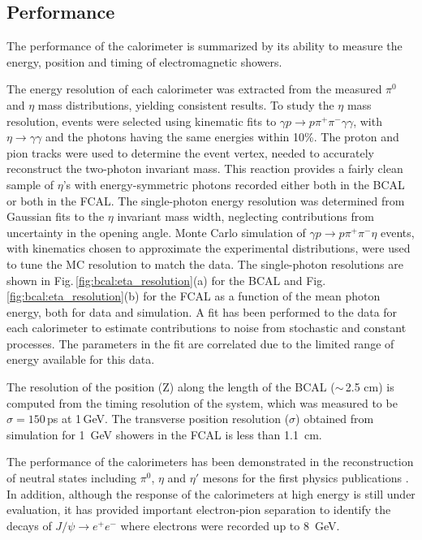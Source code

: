 \subsection{Performance \label{sec:calperformance}}
The performance of the calorimeter is summarized by its ability to measure the energy, position and timing of electromagnetic showers.

The energy resolution of each calorimeter was extracted from the measured $\pi^0$ and $\eta$ mass distributions, yielding consistent results. 
To study the $\eta$ mass resolution, events were selected using kinematic fits to $\gamma p \rightarrow p \pi^+ \pi^- \gamma \gamma$, with $\eta\rightarrow \gamma\gamma$ and the photons having the same energies within 10\%.
The proton and pion tracks were used to determine the event vertex, needed to accurately reconstruct the two-photon invariant mass.
This reaction provides a fairly clean sample of $\eta$'s with energy-symmetric photons recorded either both in the BCAL or both in the FCAL. 
The single-photon energy resolution was determined from Gaussian fits to the $\eta$ invariant mass width, neglecting contributions from uncertainty in the opening angle.
Monte Carlo simulation of $\gamma p \rightarrow p \pi^+ \pi^- \eta$ events, with kinematics chosen to approximate the experimental distributions, were used to tune the MC resolution to match the data. 
The single-photon resolutions are shown in Fig.\,\ref{fig:bcal:eta_resolution}(a) for the BCAL and Fig.\,\ref{fig:bcal:eta_resolution}(b) for the FCAL as a function of the mean photon energy, both for data and simulation.
A fit has been performed to the data for each calorimeter to estimate contributions to noise from stochastic and constant processes.  The parameters in the fit are correlated due to the limited range of energy available for this data.

The resolution of the position (Z) along the length of the BCAL ($\sim$\,2.5 cm) is computed from the timing resolution of the system, which was measured to be $\sigma=150$\,ps at 1\,GeV. The transverse position resolution ($\sigma$) obtained from simulation for 1~GeV showers in the FCAL is less than 1.1~cm.

The performance of the calorimeters has been demonstrated in the reconstruction of neutral states including $\pi^0$, $\eta$ and $\eta'$ mesons for the first \gx{} physics publications \cite{AlGhoul:2017nbp,Adhikari:2019gfa}. In addition, although the response of the calorimeters at high energy is still under evaluation, it has provided important electron-pion separation to identify the decays of $J/\psi\rightarrow e^+e^-$ \cite{Ali:2019lzf} where electrons were recorded up to 8~GeV. 

